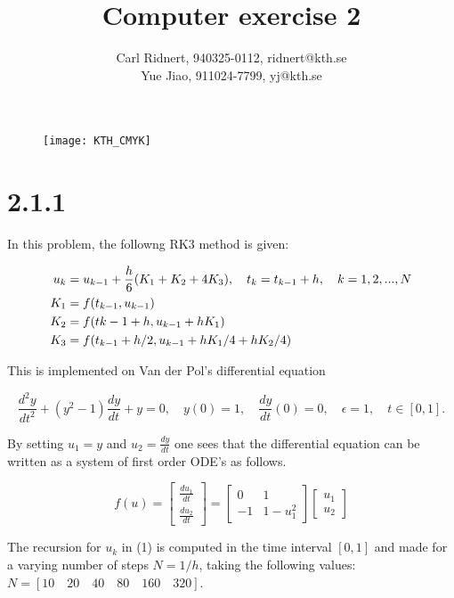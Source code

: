 \documentclass[11pt,a4paper,roman]{scrartcl}
\title{Computer exercise 2}
\date{}
\author{Carl Ridnert, 940325-0112, ridnert@kth.se \\
Yue Jiao, 911024-7799, yj@kth.se}
\begin{document}
\maketitle
\begin{figure}[h]
\centering
\texttt{[image: KTH\_CMYK]}
\end{figure}
\newpage


\section*{2.1.1}

In this problem, the followng RK3 method is given:

\begin{equation}
\begin{aligned}
\centering
u_k & =u_{k-1}+\frac{h}{6}(K_1+K_2+4K_3),\quad t_k=t_{k-1}+h, \quad k=1,2, ..., N \\
K_1 & =f(t_{k-1},u_{k-1})\\
K_2 & =f(t{k-1}+h,u_{k-1}+hK_1)\\
K_3 & =f(t_{k-1}+h/2,u_{k-1}+hK_1/4+hK_2/4) 
\end{aligned}
\end{equation}


This is implemented on Van der Pol's differential equation

\begin{equation}
\frac{d^2y}{dt^2}+(y^2-1)\frac{dy}{dt}+y=0, \quad y(0)=1, \quad \frac{dy}{dt}(0)=0, \quad \epsilon=1, \quad t\in [0,1].
\end{equation}

By setting $u_1=y$ and $u_2=\frac{dy}{dt}$ one sees that the differential equation can be written as a system of first order ODE's as follows.

\begin{equation}
f(u) =\begin{bmatrix}
  \frac{du_1}{dt} \\
  \frac{du_2}{dt}
 \end{bmatrix}=
 \begin{bmatrix}
 0 & 1 \\
 -1 & 1-u_1^2
 \end{bmatrix}
 \begin{bmatrix}
 u_1 \\
 u_2
 \end{bmatrix}
\end{equation}

The recursion for $u_k$ in (1) is computed in the time interval $[0,1]$ and made for a varying number of steps $N=1/h$, taking the following values: $N=[10\quad20\quad 40\quad 80\quad 160\quad 320]$.\\
\end{document}
